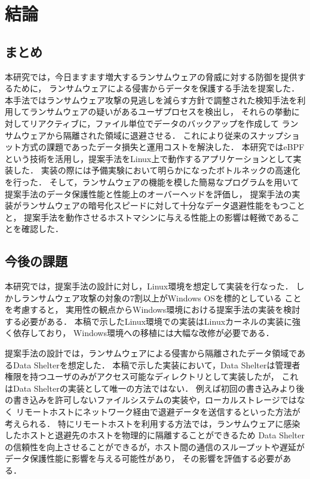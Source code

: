 \chapter{結論}
\section{まとめ}
本研究では，今日ますます増大するランサムウェアの脅威に対する防御を提供するために，
ランサムウェアによる侵害からデータを保護する手法を提案した．
本手法ではランサムウェア攻撃の見逃しを減らす方針で調整された検知手法を利用してランサムウェアの疑いがあるユーザプロセスを検出し，
それらの挙動に対してリアクティブに，ファイル単位でデータのバックアップを作成して
ランサムウェアから隔離された領域に退避させる．
これにより従来のスナップショット方式の課題であったデータ損失と運用コストを解決した．
本研究ではeBPFという技術を活用し，提案手法をLinux上で動作するアプリケーションとして実装した．
実装の際には予備実験において明らかになったボトルネックの高速化を行った．
そして，ランサムウェアの機能を模した簡易なプログラムを用いて提案手法のデータ保護性能と性能上のオーバーヘッドを評価し，
提案手法の実装がランサムウェアの暗号化スピードに対して十分なデータ退避性能をもつことと，
提案手法を動作させるホストマシンに与える性能上の影響は軽微であることを確認した．

\section{今後の課題}
本研究では，提案手法の設計に対し，Linux環境を想定して実装を行なった．
しかしランサムウェア攻撃の対象の7割以上がWindows OSを標的としている \cite{trendmicro-report} ことを考慮すると，
実用性の観点からWindows環境における提案手法の実装を検討する必要がある．
本稿で示したLinux環境での実装はLinuxカーネルの実装に強く依存しており，
Windows環境への移植には大幅な改修が必要である．

提案手法の設計では，ランサムウェアによる侵害から隔離されたデータ領域であるData Shelterを想定した．
本稿で示した実装において，Data Shelterは管理者権限を持つユーザのみがアクセス可能なディレクトリとして実装したが，
これはData Shelterの実装として唯一の方法ではない．
例えば初回の書き込みより後の書き込みを許可しないファイルシステムの実装や，ローカルストレージではなく
リモートホストにネットワーク経由で退避データを送信するといった方法が考えられる．
特にリモートホストを利用する方法では，ランサムウェアに感染したホストと退避先のホストを物理的に隔離することができるため
Data Shelterの信頼性を向上させることができるが，ホスト間の通信のスループットや遅延がデータ保護性能に影響を与える可能性があり，
その影響を評価する必要がある．

